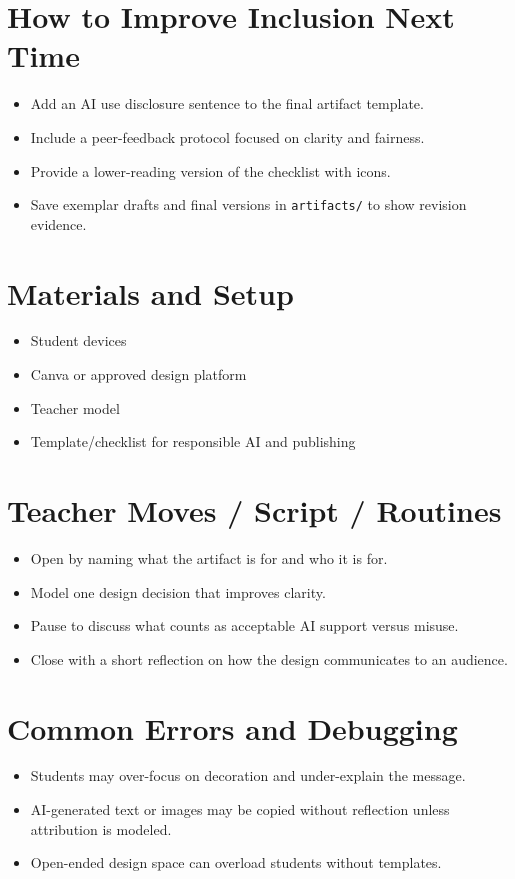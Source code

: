 \documentclass[11pt]{article}
\begin{document}
\section*{How to Improve Inclusion Next Time}
\begin{itemize}[leftmargin=*]
\item Add an AI use disclosure sentence to the final artifact template.
\item Include a peer-feedback protocol focused on clarity and fairness.
\item Provide a lower-reading version of the checklist with icons.
\item Save exemplar drafts and final versions in \texttt{artifacts/} to show revision evidence.
\end{itemize}

\section*{Materials and Setup}
\begin{itemize}[leftmargin=*]
\item Student devices
\item Canva or approved design platform
\item Teacher model
\item Template/checklist for responsible AI and publishing
\end{itemize}

\section*{Teacher Moves / Script / Routines}
\begin{itemize}[leftmargin=*]
\item Open by naming what the artifact is for and who it is for.
\item Model one design decision that improves clarity.
\item Pause to discuss what counts as acceptable AI support versus misuse.
\item Close with a short reflection on how the design communicates to an audience.
\end{itemize}

\section*{Common Errors and Debugging}
\begin{itemize}[leftmargin=*]
\item Students may over-focus on decoration and under-explain the message.
\item AI-generated text or images may be copied without reflection unless attribution is modeled.
\item Open-ended design space can overload students without templates.
\end{itemize}
\end{document}
